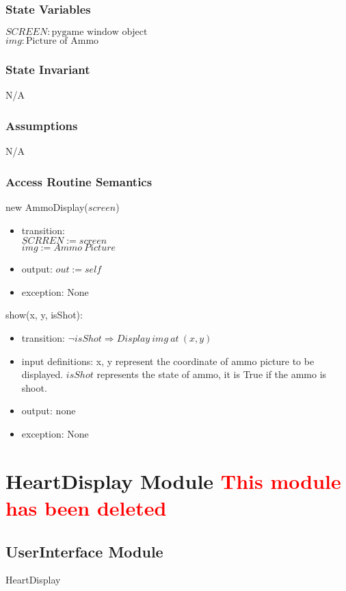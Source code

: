 \documentclass[12pt]{article}
\begin{document}
\subsubsection*{State Variables}
$SCREEN : \text{pygame window object}$\\
$img : \text{Picture of Ammo}$
\subsubsection*{State Invariant}
N/A
\subsubsection*{Assumptions}
N/A
\subsubsection*{Access Routine Semantics}

new AmmoDisplay($screen$)
\begin{itemize}
    \item transition:\\
    $SCRREN := screen$\\
    $img := Ammo\ Picture$
    \item output: $out := self$
    \item exception: None
\end{itemize}

\noindent show(x, y, isShot):
\begin{itemize}
    \item transition: $\lnot isShot \Rightarrow Display\ img\ at\ (x, y)$
    \item input definitions: x, y represent the coordinate of ammo picture
    to be displayed. $isShot$ represents the state of ammo, it is True if the ammo is shoot.
    \item output: none
    \item exception: None
\end{itemize}
\newpage

\section{HeartDisplay Module \textcolor{red}{This module has been deleted}}

\subsection*{UserInterface Module}
HeartDisplay
\end{document}
